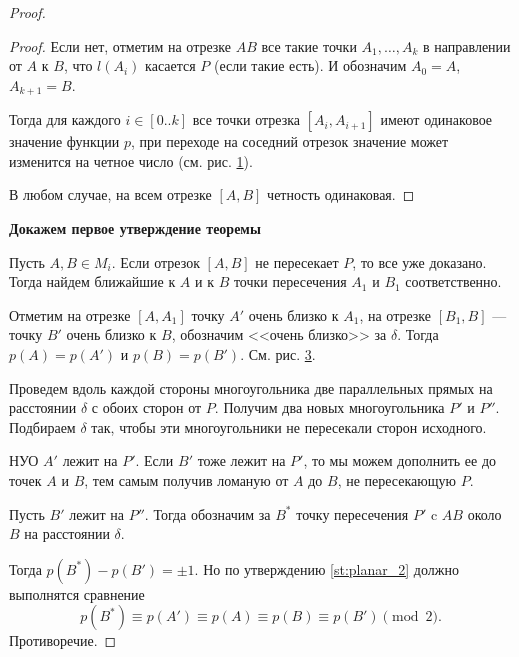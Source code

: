 \begin{proof}
\begin{proof}
		Если нет, отметим на отрезке $AB$ все такие точки $A_1, \ldots , A_k$ в направлении от $A$ к $B$, что $l(A_i)$ касается $P$ (если такие есть). И обозначим $A_0 = A$, $A_{k+1}  = B$.

		Тогда для каждого $i \in [0..k]$ все точки отрезка $[A_i, A_{i+1}]$ имеют одинаковое значение функции $p$, при переходе на соседний отрезок значение может изменится на четное число (см. рис. \ref{fig:jordan-theorem}).

		В любом случае, на всем отрезке $[A, B]$ четность одинаковая.
	\end{proof}
	\begin{figure}[ht]
		\centering
		\begin{subfigure}{0.48\textwidth}
			\centering
			\caption{}
			\label{fig:jordan-theorem}
		\end{subfigure}
		\hfill
		\begin{subfigure}{0.48\textwidth}
			\centering
			\caption{}
			\label{fig:jordan-theorem-2}
		\end{subfigure}
			\caption{}
	\end{figure}
	\textbf{Докажем первое утверждение теоремы}

	Пусть $A, B \in M_i$. Если отрезок $[A, B]$ не пересекает $P$, то все уже доказано. Тогда найдем ближайшие к $A$ и к $B$ точки пересечения $A_1$ и $B_1$ соответственно.

	Отметим на отрезке $[A, A_1]$ точку $A'$ очень близко к $A_1$, на отрезке $[B_1, B]$ --- точку $B'$ очень близко к $B$, обозначим <<очень близко>> за $\delta$. Тогда $p(A) = p(A')$ и $p(B) = p(B')$. См. рис. \ref{fig:jordan-theorem-2}.

	Проведем вдоль каждой стороны многоугольника две параллельных прямых на расстоянии $\delta$ с обоих сторон от $P$. Получим два новых многоугольника $P'$ и $P''$. Подбираем $\delta$ так, чтобы эти многоугольники не пересекали сторон исходного.

	НУО $A'$ лежит на $P'$. Если $B'$ тоже лежит на $P'$, то мы можем дополнить ее до точек $A$ и $B$, тем самым получив ломаную от $A$ до $B$, не пересекающую $P$.

	Пусть $B'$ лежит на $P''$. Тогда обозначим за $B^*$ точку пересечения $P'$ c $AB$ около $B$ на расстоянии $\delta$.

	Тогда $p(B^*) - p(B') = \pm 1$. Но по утверждению \ref{st:planar_2} должно выполнятся сравнение 
	\[
	p(B^*) \equiv p(A') \equiv p(A) \equiv p(B) \equiv p(B') \pmod 2
	.\] 
	Противоречие. 
\end{proof}
